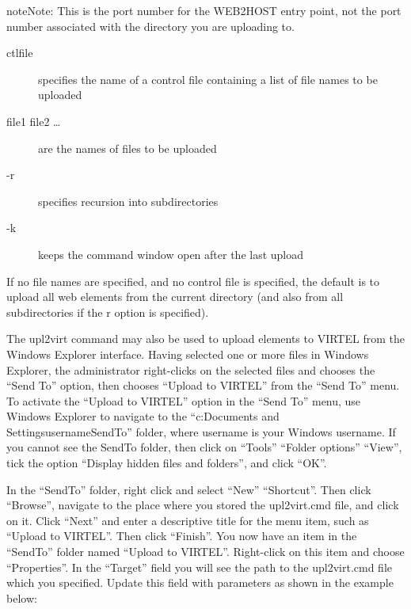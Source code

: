 \documentclass[letterpaper,10pt,english]{sphinxmanual}
\begin{document}
\begin{sphinxadmonition}{note}{Note:}
This is the port number for the WEB2HOST entry point, not the port number associated with the directory you are uploading to.
\end{sphinxadmonition}
\begin{description}
\item[{ctlfile}] \leavevmode
specifies the name of a control file containing a list of file names to be uploaded

\item[{file1 file2 …}] \leavevmode
are the names of files to be uploaded

\item[{-r}] \leavevmode
specifies recursion into subdirectories

\item[{-k}] \leavevmode
keeps the command window open after the last upload

\end{description}

If no file names are specified, and no control file is specified, the default is to upload all web elements from the current directory (and also from all subdirectories if the \textendash{}r option is specified).


The upl2virt command may also be used to upload elements to VIRTEL from the Windows Explorer interface. Having selected one or more files in Windows Explorer, the administrator right-clicks on the selected files and chooses the “Send To” option, then chooses “Upload to VIRTEL” from the “Send To” menu. To activate the “Upload to VIRTEL” option in the “Send To” menu, use Windows Explorer to navigate to the “c:Documents and SettingsusernameSendTo” folder, where username is your Windows username. If you cannot see the SendTo folder, then click on “Tools” \textendash{} “Folder options” \textendash{} “View”, tick the option “Display hidden files and folders”, and click “OK”.

In the “SendTo” folder, right click and select “New” \textendash{} “Shortcut”. Then click “Browse”, navigate to the place where you stored the upl2virt.cmd file, and click on it. Click “Next” and enter a descriptive title for the menu item, such as “Upload to VIRTEL”. Then click “Finish”. You now have an item in the “SendTo” folder named “Upload to VIRTEL”. Right-click on this item and choose “Properties”. In the “Target” field you will see the path to the upl2virt.cmd file which you specified. Update this field with parameters as shown in the example below:
\end{document}
